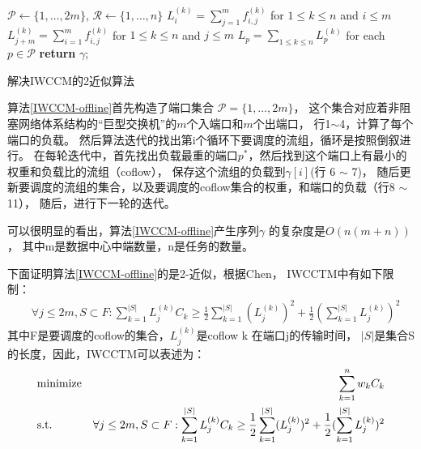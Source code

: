 \begin{algorithm}
$\mathcal{P} \gets \{1, \dots, 2m\}$, $\mathcal{R} \gets \{1, \dots, n\}$\;
 $L_i^{(k)}= \sum_{j=1}^mf_{i,j}^{(k)}$  for $1 \le k \le n$ and $i \le m$\;
  $L_{j+m}^{(k)}= \sum_{i=1}^mf_{i,j}^{(k)}$ for $1 \le k \le n$ and $ j \le m$\;
 $L_p=\sum_{1 \le k \le n}L_p^{(k)}$ for each $p \in \mathcal{P}$\;
  \textbf{return} $\gamma$;
  \caption{解决IWCCM的2近似算法}
  \label{IWCCM-offline}
 \end{algorithm}
 
 
 算法\ref{IWCCM-offline}首先构造了端口集合 $\mathcal{P}=\{1, \dots, 2m\}$，
 这个集合对应着非阻塞网络体系结构的“巨型交换机”的$m$个入端口和$m$个出端口，
 行1$\sim$4，计算了每个端口的负载。
 然后算法迭代的找出第i个循环下要调度的流组，循环是按照倒叙进行。
 在每轮迭代中，首先找出负载最重的端口$p^*$，然后找到这个端口上有最小的权重和负载比的流组（coflow），
 保存这个流组的负载到$\gamma[i]$(行 6 $\sim$ 7)，
 随后更新要调度的流组的集合，以及要调度的coflow集合的权重，和端口的负载（行8 $\sim$ 11），
 随后，进行下一轮的迭代。
 
 可以很明显的看出，算法\ref{IWCCM-offline}产生序列$\gamma$ 的复杂度是$O(n(m+n))$，
 其中m是数据中心中端数量，n是任务的数量。
 
下面证明算法\ref{IWCCM-offline}的是2-近似，根据Chen\cite{chen2000supply}，
 IWCCTM中有如下限制：
 \begin{eqnarray}
  &\forall j \leq 2m, S \subset F: \sum_{k=1}^{|S|} L_{j}^{(k)} C_{k} \geq \frac{1}{2}\sum_{k=1}^{|S|} (L_{j}^{(k)})^2+ \frac{1}{2}(\sum_{k=1}^{|S|} L_{j}^{(k)})^2
\end{eqnarray}
其中F是要调度的coflow的集合，$L_{j}^{(k)}$是coflow k 在端口j的传输时间，
$|S|$是集合S的长度，因此，IWCCTM可以表述为：
 \begin{eqnarray}
 & {\rm minimize} & \sum_{k=1}^{n} w_{k} C_{k} \label{eq:WCCO-SC2} \\
& {\rm s.t.} &\forall j \leq 2m, S \subset F: \sum_{k=1}^{|S|} L_{j}^{(k)} C_{k} \geq \frac{1}{2}\sum_{k=1}^{|S|} (L_{j}^{(k)})^2+ \frac{1}{2}(\sum_{k=1}^{|S|} L_{j}^{(k)})^2  \label{eq:IWCCM-SC3}
\end{eqnarray}

